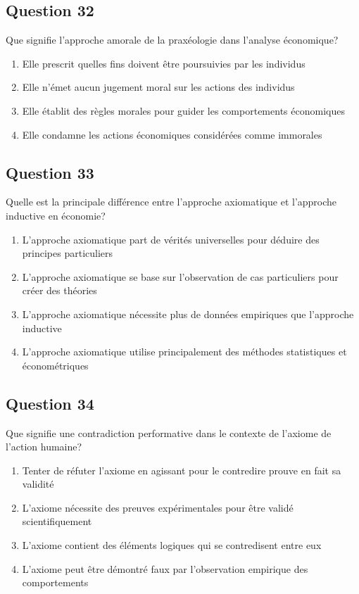 \documentclass[12pt,a4paper]{article}
\begin{document}
\bigskip


\subsection*{Question 32}
Que signifie l'approche amorale de la praxéologie dans l'analyse économique?

\begin{enumerate}[label=\Alph*., leftmargin=*]
\item Elle prescrit quelles fins doivent être poursuivies par les individus
\item Elle n'émet aucun jugement moral sur les actions des individus
\item Elle établit des règles morales pour guider les comportements économiques
\item Elle condamne les actions économiques considérées comme immorales
\end{enumerate}

\bigskip


\subsection*{Question 33}
Quelle est la principale différence entre l'approche axiomatique et l'approche inductive en économie?

\begin{enumerate}[label=\Alph*., leftmargin=*]
\item L'approche axiomatique part de vérités universelles pour déduire des principes particuliers
\item L'approche axiomatique se base sur l'observation de cas particuliers pour créer des théories
\item L'approche axiomatique nécessite plus de données empiriques que l'approche inductive
\item L'approche axiomatique utilise principalement des méthodes statistiques et économétriques
\end{enumerate}

\bigskip


\subsection*{Question 34}
Que signifie une contradiction performative dans le contexte de l'axiome de l'action humaine?

\begin{enumerate}[label=\Alph*., leftmargin=*]
\item Tenter de réfuter l'axiome en agissant pour le contredire prouve en fait sa validité
\item L'axiome nécessite des preuves expérimentales pour être validé scientifiquement
\item L'axiome contient des éléments logiques qui se contredisent entre eux
\item L'axiome peut être démontré faux par l'observation empirique des comportements
\end{enumerate}
\end{document}
